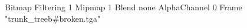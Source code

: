 {Bitmap
	{Filtering 1}
	{Mipmap 1}
	{Blend none}
	{AlphaChannel 0}
	{Frame "trunk_treeb#broken.tga"}
}
